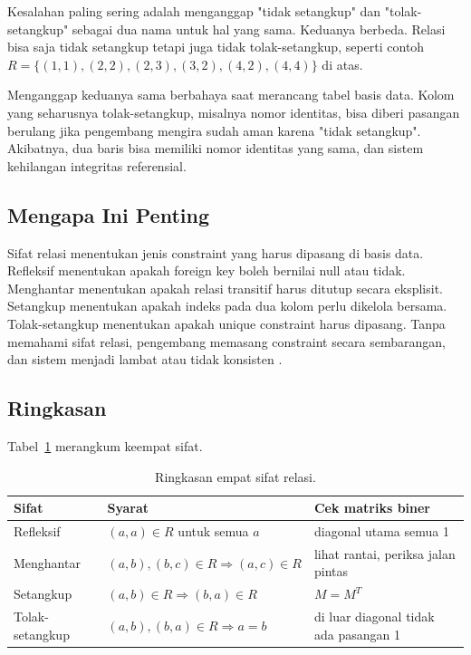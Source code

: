 \documentclass[11pt,a4paper]{article}
\begin{document}
Kesalahan paling sering adalah menganggap "tidak setangkup" dan "tolak-setangkup" sebagai dua nama untuk hal yang sama. Keduanya berbeda. Relasi bisa saja tidak setangkup tetapi juga tidak tolak-setangkup, seperti contoh $R=\{(1,1),(2,2),(2,3),(3,2),(4,2),(4,4)\}$ di atas.

Menganggap keduanya sama berbahaya saat merancang tabel basis data. Kolom yang seharusnya tolak-setangkup, misalnya nomor identitas, bisa diberi pasangan berulang jika pengembang mengira sudah aman karena "tidak setangkup". Akibatnya, dua baris bisa memiliki nomor identitas yang sama, dan sistem kehilangan integritas referensial.

\subsection{Mengapa Ini Penting}

Sifat relasi menentukan jenis constraint yang harus dipasang di basis data. Refleksif menentukan apakah foreign key boleh bernilai null atau tidak. Menghantar menentukan apakah relasi transitif harus ditutup secara eksplisit. Setangkup menentukan apakah indeks pada dua kolom perlu dikelola bersama. Tolak-setangkup menentukan apakah unique constraint harus dipasang. Tanpa memahami sifat relasi, pengembang memasang constraint secara sembarangan, dan sistem menjadi lambat atau tidak konsisten \cite{silberschatz}.

\subsection{Ringkasan}

Tabel~\ref{tab:sifat} merangkum keempat sifat.

\begin{table}[H]
	\centering
	\caption{Ringkasan empat sifat relasi.}
	\label{tab:sifat}
	\small
	\begin{tabularx}{\textwidth}{l X X}
		\toprule
		Sifat           & Syarat                                      & Cek matriks biner                     \\
		\midrule
		Refleksif       & $(a,a) \in R$ untuk semua $a$               & diagonal utama semua 1                \\
		Menghantar      & $(a,b),(b,c) \in R \Rightarrow (a,c) \in R$ & lihat rantai, periksa jalan pintas    \\
		Setangkup       & $(a,b) \in R \Rightarrow (b,a) \in R$       & $M=M^T$                               \\
		Tolak-setangkup & $(a,b),(b,a) \in R \Rightarrow a=b$         & di luar diagonal tidak ada pasangan 1 \\
		\bottomrule
	\end{tabularx}
\end{table}
\end{document}
